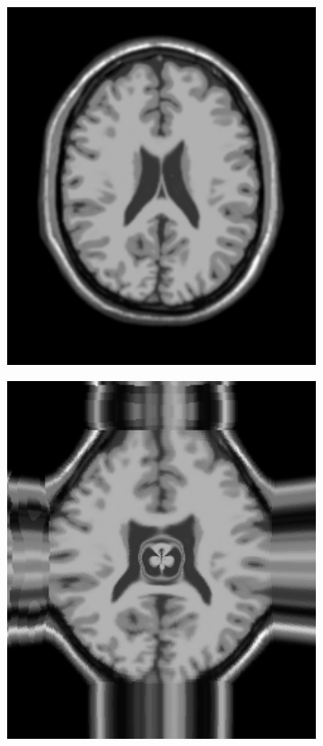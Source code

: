 \documentclass[t]{beamer}
\begin{document}
\begin{frame}
  \begin{figure}[H]
    \centering
    \begin{subfigure}[b]{0.49\textwidth}
      \includegraphics[width=1\textwidth]{figuras/screen.png}
    \end{subfigure}
    \begin{subfigure}[b]{0.49\textwidth}
      \includegraphics[width=1\textwidth]{figuras/resultDist.png}

\end{subfigure}
\end{figure}
\end{frame}
\end{document}
